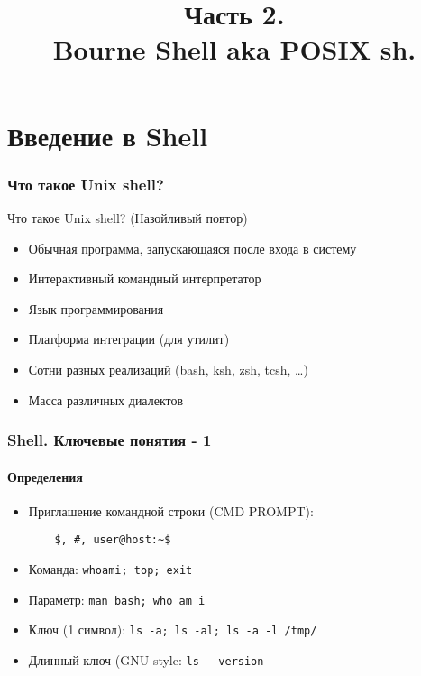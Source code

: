 


\title[SaM Solutions. Linux QA Training]
{
  Часть 2.\\
  Bourne Shell aka POSIX sh.
}


\begin{frame}
  \titlepage
\end{frame}

\section{Введение в Shell}

\begin{frame}
  \frametitle{Что такое Unix shell?}
  
  \alert{Что такое Unix shell? (Назойливый повтор)}

  \begin{itemize}
    \item Обычная программа, запускающаяся после входа в систему
    \item Интерактивный командный интерпретатор
    \item Язык программирования
    \item Платформа интеграции (для утилит)
    \item Сотни разных реализаций (bash, ksh, zsh, tcsh, \ldots )
    \item Масса различных диалектов
  \end{itemize}

\end{frame}

\begin{frame}[fragile]
  \frametitle{Shell. Ключевые понятия - 1}
  \framesubtitle{Определения}

  \begin{itemize}
    \item \alert{Приглашение командной строки (CMD PROMPT)}: \pause 
      \begin{verbatim}
	$, #, user@host:~$
      \end{verbatim} \pause
    \item \alert{Команда}: \newline \verb+whoami; top; exit+ \pause
    \item \alert{Параметр}: \newline \verb+man bash; who am i+ \pause
    \item \alert{Ключ (1 символ)}: \newline \verb+ls -a; ls -al; ls -a -l /tmp/+ \pause
    \item \alert{Длинный ключ (GNU-style}: \newline \verb+ls --version+
  \end{itemize}
\end{frame}

